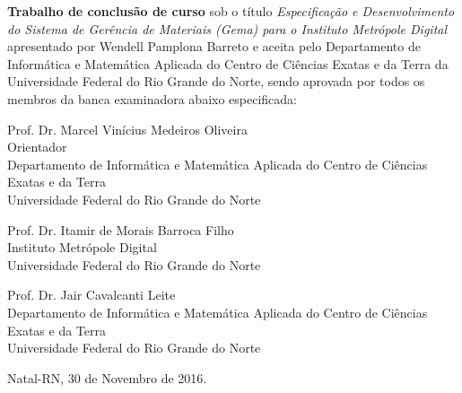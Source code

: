 \begin{folhadeaprovacao}
	\setlength{\ABNTsignthickness}{0.4pt}
	\setlength{\ABNTsignwidth}{10cm}
	
	\noindent 
	\textbf{Trabalho de conclusão de curso} sob o título \textit{Especificação e Desenvolvimento do Sistema de Gerência de Materiais (Gema) para o Instituto Metrópole Digital} apresentado por 
	Wendell Pamplona Barreto e aceita pelo Departamento de Informática e Matemática Aplicada do
	Centro de Ciências Exatas e da Terra da Universidade Federal do Rio Grande do Norte,
	sendo aprovada por todos os membros da banca examinadora abaixo especificada:
		
	\assinatura
	{
		Prof. Dr. Marcel Vinícius Medeiros Oliveira\\
		{\small Orientador} 															\\ 
		{\footnotesize
			Departamento de Informática e Matemática Aplicada do Centro de Ciências Exatas e da Terra \\
			Universidade Federal do Rio Grande do Norte
		}
	}
	
	\assinatura
	{
		Prof. Dr. Itamir de Morais Barroca Filho						\\
		{\footnotesize
			Instituto Metrópole Digital \\
			Universidade Federal do Rio Grande do Norte
		}
	}
		
	\assinatura
	{
		Prof. Dr. Jair Cavalcanti Leite					 \\ 
		{\footnotesize
			Departamento de Informática e Matemática Aplicada do Centro de Ciências Exatas e da Terra \\
			Universidade Federal do Rio Grande do Norte
		}
	}
	\vfill
	
	\begin{center}
		Natal-RN, 30 de Novembro de 2016.
	\end{center}
\end{folhadeaprovacao}